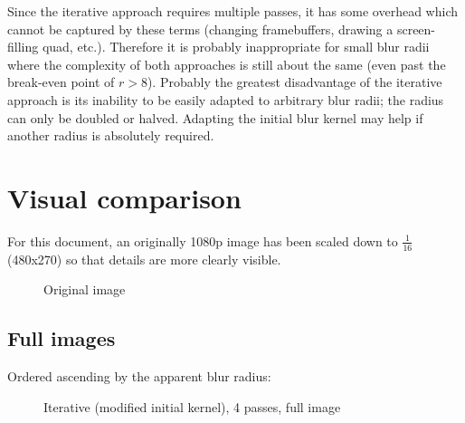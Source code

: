 \documentclass[english,fleqn,10pt,twocolumn]{article}
\begin{document}
Since the iterative approach requires multiple passes, it has some overhead which cannot be captured by these terms (changing framebuffers, drawing a screen-filling quad, etc.). Therefore it is
probably inappropriate for small blur radii where the complexity of both approaches is still about the same (even past the break-even point of $r > 8$). Probably the greatest disadvantage of the
iterative approach is its inability to be easily adapted to arbitrary blur radii; the radius can only be doubled or halved. Adapting the initial blur kernel may help if another radius is absolutely
required.


\newpage

\section{Visual comparison}

For this document, an originally 1080p image has been scaled down to $\frac 1{16}$ (480x270) so that details are more clearly visible.

\begin{figure}[H]
    \centering {}
    \caption{Original image}
\end{figure}

\subsection{Full images}

Ordered ascending by the apparent blur radius:

\begin{figure}[H]
    \centering {}
    \caption{Iterative (modified initial kernel), 4 passes, full image}
\end{figure}
\end{document}
